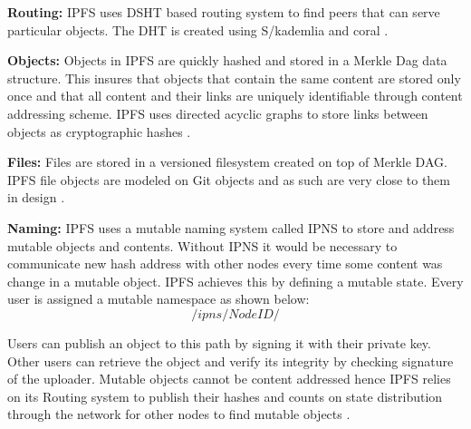 \textbf{Routing:} IPFS uses DSHT based routing system to find peers that can serve particular objects. The DHT is created using S/kademlia and coral \cite{DBLP:journals/corr/Benet14}.

\textbf{Objects:} Objects in IPFS are quickly hashed and stored in a Merkle Dag data structure. This insures that objects that contain the same content are stored only once and that all content and their links are uniquely identifiable through content addressing scheme. IPFS uses directed acyclic graphs to store links between objects as cryptographic hashes \cite{DBLP:journals/corr/Benet14}.
   
\textbf{Files:} Files are stored in a versioned filesystem created on top of Merkle DAG. IPFS file objects are modeled on Git objects and as such are very close to them in design \cite{DBLP:journals/corr/Benet14}.

\textbf{Naming:} IPFS uses a mutable naming system called IPNS to store and address mutable objects and contents. Without IPNS it would be necessary to communicate new hash address with other nodes every time some content was change in a mutable object. IPFS achieves this by defining a mutable state. Every user is assigned a mutable namespace as shown below: \cite{DBLP:journals/corr/Benet14}
\[ /ipns/NodeID/  \] 

Users can publish an object to this path by signing it with their private key. Other users can retrieve the object and verify its integrity by checking signature of the uploader.  Mutable objects cannot be content addressed hence IPFS relies on its Routing system to publish their hashes and counts on state distribution through the network for other nodes to find mutable objects \cite{DBLP:journals/corr/Benet14}.
 



